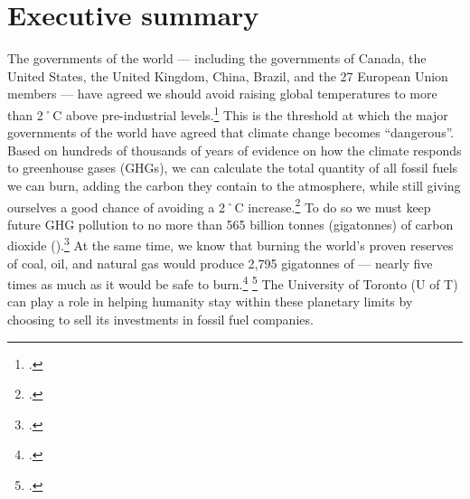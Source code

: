 

		\singlespacing
		\section{Executive summary}
		\label{sec:ExecutiveSummary}
		\doublespacing






The governments of the world --- including the governments of Canada, the United States, the United Kingdom, China, Brazil, and the 27 European Union members --- have agreed we should avoid raising global temperatures to more than 2˚C above pre-industrial levels.\footcite[][]{CopenhagenAccord}
This is the threshold at which the major governments of the world have agreed that climate change becomes ``dangerous''.
Based on hundreds of thousands of years of evidence on how the climate responds to greenhouse gases (GHGs), we can calculate the total quantity of all fossil fuels we can burn, adding the carbon they contain to the atmosphere, while still giving ourselves a good chance of avoiding a 2˚C increase.\footcite[Research published in \emph{Nature} highlights how even a limit of 2˚C of warming ``is not sufficient to control many other quantities, such as transient sea level rise, ocean acidification and net primary production on land''. Limiting warming to a lesser level would require even more aggressive action than described in this brief.][p. 197]{Steinacher2013}
To do so we must keep future GHG pollution to no more than 565 billion tonnes (gigatonnes) of carbon dioxide ().\footcite[For a more detailed explanation that is accessible to non-experts see: ][]{TerrifyingNewMath}
At the same time, we know that burning the world's proven reserves of coal, oil, and natural gas would produce 2,795 gigatonnes of  --- nearly five times as much as it would be safe to burn.\footcite[][]{CTI2012} \footcite[Another accessible summary of the issue can be found in this free hour-long radio program: ][]{HotBackyard}
The University of Toronto (U of T) can play a role in helping humanity stay within these planetary limits by choosing to sell its investments in fossil fuel companies.



